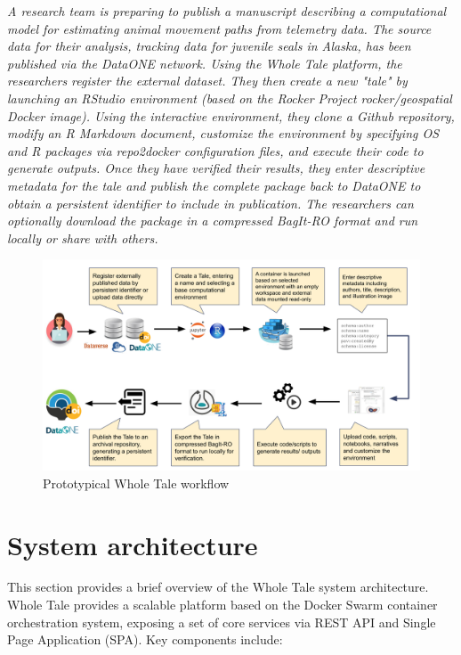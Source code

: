 \documentclass[conference]{IEEEtran}
\begin{document}
\emph{A research team is preparing to publish a manuscript describing a computational model for 
estimating animal movement paths from telemetry data.  The source data for their analysis, 
tracking data for juvenile seals in Alaska, has been published via the DataONE network. Using the 
Whole Tale platform, the researchers register the external dataset. They then create a new "tale" 
by launching an RStudio environment (based on the Rocker Project rocker/geospatial Docker image). 
Using the interactive environment, they clone a Github repository, modify an R Markdown document, 
customize the environment by specifying OS and R packages via repo2docker configuration files, and 
execute their code to generate outputs. Once they have verified their results, they enter 
descriptive metadata for the tale and publish the complete package back to DataONE to obtain a 
persistent identifier to include in publication. The researchers can optionally download the 
package in a compressed BagIt-RO format and run locally or share with others.}

\begin{figure}
\centering
\includegraphics[scale=0.18]{images/wholetale-workflow.png}
\caption{Prototypical Whole Tale workflow}
\end{figure}


\section{System architecture}
This section provides a brief overview of the Whole Tale system architecture.   Whole Tale 
provides a scalable platform based on the Docker Swarm container orchestration system, exposing a 
set of core services via REST API and Single Page Application (SPA). Key components include:
\end{document}
